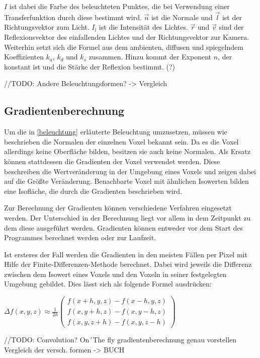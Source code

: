 $I$ ist dabei die Farbe des beleuchteten Punktes, die bei Verwendung einer Transferfunktion durch diese bestimmt wird. $\vec{n}$ ist die Normale und $\vec{l}$ ist der Richtungsvektor zum Licht. $I_{l}$ ist die Intensität des Lichtes. $\vec{r}$ und $\vec{v}$ sind der Reflexionsvektor des einfallenden Lichtes und der Richtungsvektor zur Kamera. Weiterhin setzt sich die Formel aus dem ambienten, diffusen und spiegelndem Koeffizienten $k_{a}$, $k_{d}$ und $k_{s}$ zusammen. Hinzu kommt der Exponent $n$, der konstant ist und die Stärke der Reflexion bestimmt. (?)

//TODO: Andere Beleuchtungsformen? -> Vergleich

\subsection{Gradientenberechnung}

Um die in \ref{beleuchtung} erläuterte Beleuchtung umzusetzen, müssen wie beschrieben die Normalen der einzelnen Voxel bekannt sein. Da es die Voxel allerdings keine Oberfläche bilden, besitzen sie auch keine Normalen. Als Ersatz können stattdessen die Gradienten der Voxel verwendet werden. Diese beschreiben die Wertveränderung in der Umgebung eines Voxels und zeigen dabei auf die Größte Veränderung. Benachbarte Voxel mit ähnlichen Isowerten bilden eine Isofläche, die durch die Gradienten beschrieben wird. 

Zur Berechnung der Gradienten können verschiedene Verfahren eingesetzt werden. Der Unterschied in der Berechnung liegt vor allem in dem Zeitpunkt zu dem diese ausgeführt werden. Gradienten können entweder vor dem Start des Programmes berechnet werden oder zur Laufzeit. 

Ist ersteres der Fall werden die Gradienten in den meisten Fällen per Pixel mit Hilfe der Finite-Differenzen-Methode berechnet. 
Dabei wird jeweils die Differenz zwischen dem Isowert eines Voxels und den Voxeln in seiner festgelegten Umgebung gebildet. Dies lässt sich als folgende Formel ausdrücken: 

$
\Delta f(x,y,z)\approx \frac{1}{2h}
\left ( \begin{matrix}
f(x + h, y, z) - f(x - h, y, z)\\ 
f(x, y + h, z) - f(x, y - h, z)\\ 
f(x, y, z + h) - f(x, y, z - h)
\end{matrix} \right )
$

//TODO:
Convolution?
On´The fly gradientenberechnung
genau vorstellen
Vergleich der versch. formen -> BUCH

